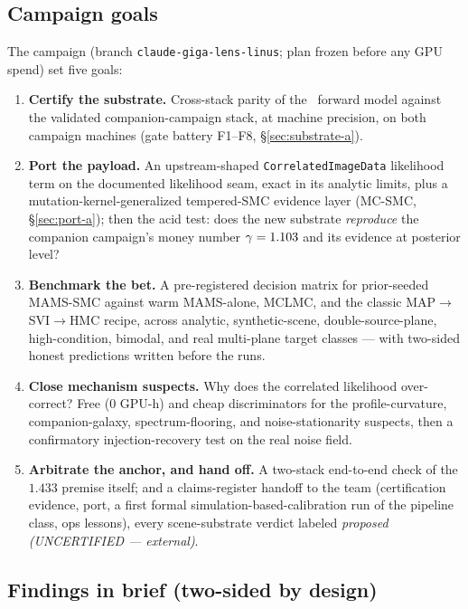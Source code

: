 \subsection{Campaign goals}

The campaign (branch \texttt{claude-giga-lens-linus}; plan frozen before
any GPU spend) set five goals:

\begin{enumerate}
\item \textbf{Certify the substrate.} Cross-stack parity of the \sceneapi\
  forward model against the validated companion-campaign stack, at
  machine precision, on both campaign machines (gate battery F1--F8,
  \S\ref{sec:substrate-a}).
\item \textbf{Port the payload.} An upstream-shaped
  \texttt{CorrelatedImageData} likelihood term on the documented
  likelihood seam, exact in its analytic limits, plus a
  mutation-kernel-generalized tempered-SMC evidence layer (MC-SMC,
  \S\ref{sec:port-a}); then the acid test: does the new substrate
  \emph{reproduce} the companion campaign's money number
  $\gamma=1.103$ and its evidence at posterior level?
\item \textbf{Benchmark the bet.} A pre-registered decision matrix for
  prior-seeded MAMS-SMC against warm MAMS-alone, MCLMC, and the classic
  MAP$\to$SVI$\to$HMC recipe, across analytic, synthetic-scene,
  double-source-plane, high-condition, bimodal, and real multi-plane
  target classes --- with two-sided honest predictions written before the
  runs.
\item \textbf{Close mechanism suspects.} Why does the correlated
  likelihood over-correct? Free (0 GPU-h) and cheap discriminators for the
  profile-curvature, companion-galaxy, spectrum-flooring, and
  noise-stationarity suspects, then a confirmatory injection-recovery
  test on the real noise field.
\item \textbf{Arbitrate the anchor, and hand off.} A two-stack
  end-to-end check of the $1.433$ premise itself; and a claims-register
  handoff to the team (certification evidence, port, a first formal
  simulation-based-calibration \citep{talts2018sbc} run of the pipeline
  class, ops lessons), every scene-substrate verdict labeled
  \emph{proposed (UNCERTIFIED --- external)}.
\end{enumerate}

\subsection{Findings in brief (two-sided by design)}

